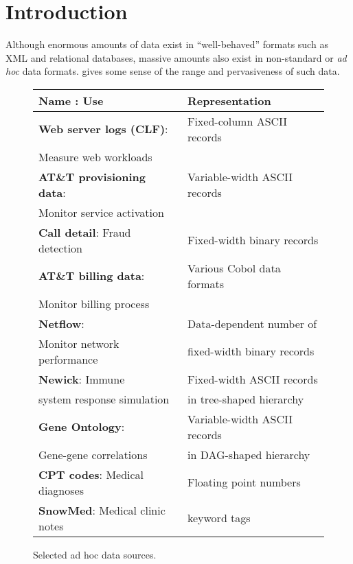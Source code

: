 \section{Introduction}
\label{section:intro}
Although enormous amounts of data exist in ``well-behaved'' formats such
as XML and relational databases, massive amounts also exist in
non-standard or \textit{ad hoc} data formats. 
gives some sense of the range and pervasiveness of such data.
\begin{figure}
\begin{center}
\begin{tabular}{l|l}
\hline
Name : Use   &  Representation               \\ \hline
\textbf{Web server logs (CLF)}:  &  Fixed-column ASCII records \\ 
Measure web workloads &                             \\ \hline
\textbf{AT\&T provisioning data}: & Variable-width ASCII records  \\ 
Monitor service activation &                              \\ \hline
\textbf{Call detail}: Fraud detection  &  Fixed-width binary records \\  \hline 
\textbf{AT\&T billing data}: & Various Cobol data formats  \\ 
Monitor billing process   &                             \\ \hline
\textbf{Netflow}:                        & Data-dependent number of     \\ 
Monitor network performance  & fixed-width binary records  \\ \hline
\textbf{Newick}:   Immune                 & Fixed-width ASCII records \\ 
system response simulation & in tree-shaped hierarchy\\ \hline                                
\textbf{Gene Ontology}:             & Variable-width ASCII records \\
Gene-gene correlations     & in DAG-shaped hierarchy \\ \hline
\textbf{CPT codes}: Medical diagnoses & Floating point numbers \\ \hline
\textbf{SnowMed}: Medical clinic notes & keyword tags  \\ 
\end{tabular}

\caption{Selected ad hoc data sources.}
\label{figure:data-sources}
\end{center}
\end{figure}
